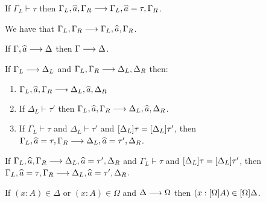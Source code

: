 \begin{mlemma}
  If $\Gamma_L \vdash \tau$ then $\Gamma_L, \widehat{a}, \Gamma_R \longrightarrow \Gamma_L,
  \widehat{a} = \tau, \Gamma_R$.
\label{lemma:solution_ext}
\end{mlemma}

\begin{mlemma}
  We have that $\Gamma_L, \Gamma_R \longrightarrow \Gamma_L, \widehat{a}, \Gamma_R$.
  \label{lemma:unsolved_ext}
\end{mlemma}

\begin{mlemma}
  If $\Gamma, \widehat{a} \longrightarrow \Delta$ then $\Gamma \longrightarrow \Delta$.
  \label{lemma:drop_ext}
\end{mlemma}


\begin{mlemma}
  If $\Gamma_L \longrightarrow \Delta_L$ and $\Gamma_L, \Gamma_R \longrightarrow \Delta_L, \Delta_R$ then:
  \begin{enumerate}
  \item $\Gamma_L, \widehat{a}, \Gamma_R \longrightarrow \Delta_L, \widehat{a}, \Delta_R$
  \item If $\Delta_L \vdash \tau'$ then $\Gamma_L, \widehat{a}, \Gamma_R \longrightarrow \Delta_L, \widehat{a}, \Delta_R$.
  \item If $\Gamma_L \vdash \tau$ and $\Delta_L \vdash \tau'$ and $[\Delta_L]\tau = [\Delta_L]\tau'$, then $\Gamma_L, \widehat{a} = \tau, \Gamma_R \longrightarrow \Delta_L, \widehat{a} = \tau', \Delta_R$.
  \end{enumerate}
  \label{lemma:paralell_admit}
\end{mlemma}

\begin{mlemma}
  If $\Gamma_L, \widehat{a}, \Gamma_R \longrightarrow \Delta_L, \widehat{a} = \tau', \Delta_R$ and
  $\Gamma_L \vdash \tau$ and $[\Delta_L]\tau =
  [\Delta_L]\tau'$, then $\Gamma_L, \widehat{a} = \tau, \Gamma_R \longrightarrow
  \Delta_L, \widehat{a} = \tau', \Delta_R$.

 \label{lemma:solved_var_add_ext}
\end{mlemma}


\begin{mlemma}
  If $(x : A) \in \Delta$ or $(x : A) \in \Omega$ and $\Delta \longrightarrow \Omega$ then $(x : [\Omega]A) \in [\Omega]\Delta$.
  \label{lemma:variable_preservation}
\end{mlemma}

